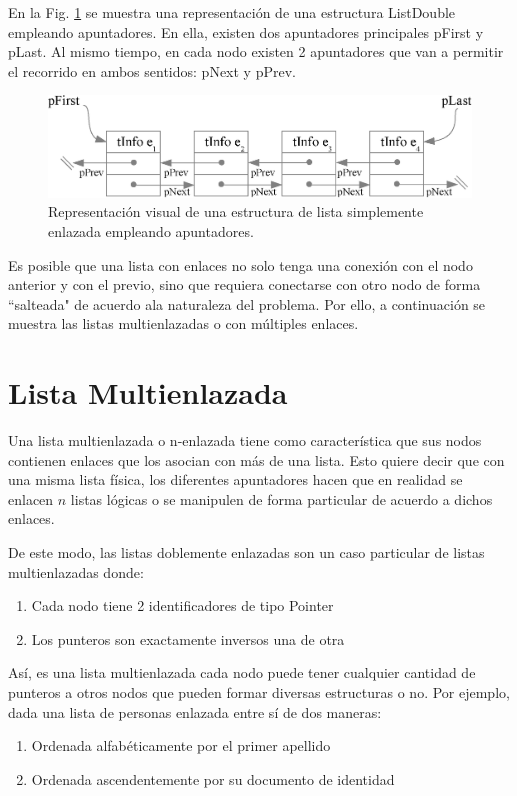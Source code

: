En la Fig. \ref{fig:listas2} se muestra una representación de una estructura ListDouble empleando apuntadores. En ella, existen dos apuntadores principales pFirst y pLast. Al mismo tiempo, en cada nodo existen 2 apuntadores que van a permitir el recorrido en ambos sentidos: pNext y pPrev.

\begin{figure}[!htb]
\centering
\includegraphics[scale=.7]{images/listas2.eps}
\caption{Representación visual de una estructura de lista simplemente enlazada empleando apuntadores.}
\label{fig:listas2}
\end{figure}

Es posible que una lista con enlaces no solo tenga una conexión con el nodo anterior y con el previo, sino que requiera conectarse con otro nodo de forma ``salteada" de acuerdo ala naturaleza del problema. Por ello, a continuación se muestra las listas multienlazadas o con múltiples enlaces.

\section{Lista Multienlazada}

Una lista multienlazada o n-enlazada tiene como característica que sus nodos contienen enlaces que los asocian con más de una lista. Esto quiere decir que con una misma lista física, los diferentes apuntadores hacen que en realidad se enlacen $n$ listas lógicas o se manipulen de forma particular de acuerdo a dichos enlaces.

De este modo, las listas doblemente enlazadas son un caso particular de listas multienlazadas donde:
\begin{enumerate}
\item Cada nodo tiene 2 identificadores de tipo Pointer
\item Los punteros son exactamente inversos una de otra
\end{enumerate}

Así, es una lista multienlazada cada nodo puede tener cualquier cantidad de punteros a otros nodos que pueden formar diversas estructuras o no. Por ejemplo, dada una lista de personas enlazada entre sí de dos maneras:
\begin{enumerate}
\item Ordenada alfabéticamente por el primer apellido
\item Ordenada ascendentemente por su documento de identidad
\end{enumerate}

